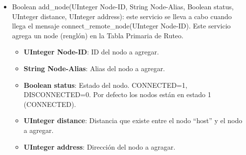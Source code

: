 \begin{itemize}
\item Boolean add\_node(UInteger Node-ID, String Node-Alias, Boolean status,
  UInteger distance, UInteger address): este servicio se lleva a cabo cuando
  llega el mensaje connect\_remote\_node(UInteger Node-ID). Este servicio
  agrega un node (renglón) en la Tabla Primaria de Ruteo.
  \begin{itemize}
  \item \textbf{UInteger Node-ID}: ID del nodo a agregar.
  \item \textbf{String Node-Alias}: Alias del nodo a agregar.
  \item \textbf{Boolean status}: Estado del nodo. CONNECTED=1, DISCONNECTED=0.
    Por defecto los nodos están en estado 1 (CONNECTED).
  \item \textbf{UInteger distance}: Distancia que existe entre el nodo
    ``host'' y el nodo a agregar.
  \item \textbf{UInteger address}: Dirección del nodo a agragar.
  \end{itemize}     
\end{itemize}



